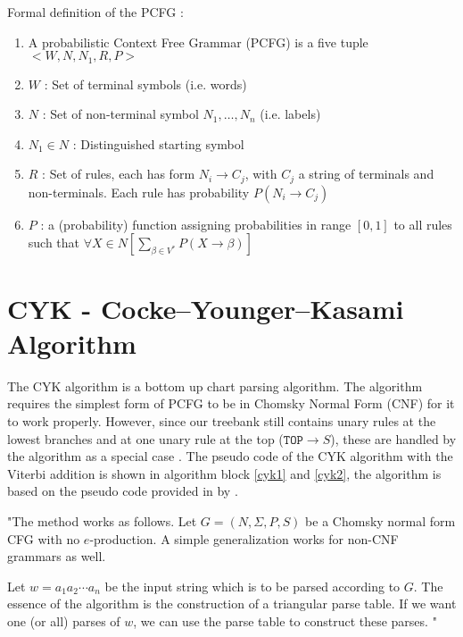 \documentclass[11pt,twocolumn]{article}
\begin{document}
Formal definition of the PCFG \cite{slides2}:
\begin{enumerate}
\item A probabilistic Context Free Grammar (PCFG) is a five tuple $< W, N, N_1, R, P >$
\item $W$ : Set of terminal symbols (i.e. words)
\item $N$ : Set of non-terminal symbol $N_1, \ldots , N_n$ (i.e. labels)
\item $N_1 \in N$ : Distinguished starting symbol
\item $R$ : Set of rules, each has form $N_i \rightarrow C_j$, with $C_j$ a string of terminals and non-terminals. Each rule has probability $P (N_i \rightarrow C_j )$
\item $P$ : a (probability) function assigning probabilities in range $[0, 1]$ to all rules such that $\forall X \in N \left[ \sum_{\beta \in V^*} P (X \rightarrow \beta) \right]$
\end{enumerate}

\section{CYK - Cocke–Younger–Kasami Algorithm}
The CYK algorithm is a bottom up chart parsing algorithm. The algorithm requires the simplest form of PCFG to be in Chomsky Normal Form (CNF) for it to work properly. However, since our treebank still contains unary rules at the lowest branches and at one unary rule at the top ($\texttt{TOP} \rightarrow S$), these are handled by the algorithm as a special case \cite{slides3}. The pseudo code of the CYK algorithm with the Viterbi addition is shown in algorithm block \ref{cyk1} and \ref{cyk2}, the algorithm is based on the pseudo code provided in by \cite{ss}.

"The method works as follows. Let $G = (N, \Sigma , P, S)$ be a Chomsky normal form CFG with no $e$-production. A simple generalization works for non-CNF grammars as well. 

Let $w = a_1 a_2 \cdots a_n$ be the input string which is to be parsed according to $G$. The essence of the algorithm is the construction of a triangular parse table. If we want one (or all) parses of $w$, we can use the parse table to construct these parses. \cite{cyk}"
\end{document}
